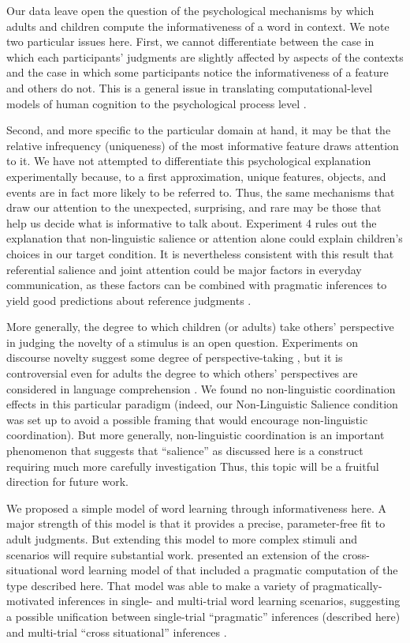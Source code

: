 \documentclass[review]{elsarticle}
\begin{document}
Our data leave open the question of the psychological mechanisms by which adults and children compute the informativeness of a word in context. We note two particular issues here. First, we cannot differentiate between the case in which each participants' judgments are slightly affected by aspects of the contexts and the case in which some participants notice the informativeness of a feature and others do not. This is a general issue in translating computational-level models of human cognition to the psychological process level \citep{frank2013}. 

Second, and more specific to the particular domain at hand, it may be that the relative infrequency (uniqueness) of the most informative feature draws attention to it. We have not attempted to differentiate this psychological explanation experimentally because, to a first approximation, unique features, objects, and events are in fact more likely to be referred to. Thus, the same mechanisms that draw our attention to the unexpected, surprising, and rare may be those that help us decide what is informative to talk about. Experiment 4 rules out the explanation that non-linguistic salience or attention alone could explain children's choices in our target condition. It is nevertheless consistent with this result that referential salience and joint attention could be major factors in everyday communication, as these factors can be combined with pragmatic inferences to yield good predictions about reference judgments \citep{frank2012}.

More generally, the degree to which children (or adults) take others' perspective in judging the novelty of a stimulus is an open question. Experiments on discourse novelty suggest some degree of perspective-taking \citep{akhtar1996}, but it is controversial even for adults the degree to which others' perspectives are considered in language comprehension \citep{keysar2003,nadig2002,brown-schmidt2008}. We found no non-linguistic coordination effects in this particular paradigm (indeed, our Non-Linguistic Salience condition was set up to avoid a possible framing that would encourage non-linguistic coordination). But more generally, non-linguistic coordination is an important phenomenon that suggests that ``salience'' as discussed here is a construct requiring much more carefully investigation \citep{schelling1980,clark1983}  Thus, this topic will be a fruitful direction for future work. 

We proposed a simple model of word learning through informativeness here. A major strength of this model is that it provides a precise, parameter-free fit to adult judgments. But extending this model to more complex stimuli and scenarios will require substantial work. \citet{smith2013} presented an extension of the cross-situational word learning model of \citet{frank2009} that included a pragmatic computation of the type described here. That model was able to make a variety of pragmatically-motivated inferences in single- and multi-trial word learning scenarios, suggesting a possible unification between single-trial ``pragmatic'' inferences (described here) and multi-trial ``cross situational'' inferences \citep{yu2007b,frank2009}. 
\end{document}
